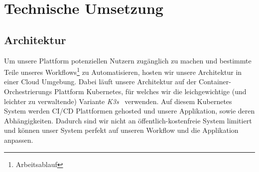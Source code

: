 
\chapter{Technische Umsetzung}


\section{Architektur}
Um unsere Plattform potenziellen Nutzern zugänglich zu machen und bestimmte Teile unseres Workflows\footnote{Arbeitsablauf} zu Automatisieren, hosten wir unsere Architektur in einer Cloud Umgebung.
Dabei läuft unsere Architektur auf der Container-Orchestrierungs Plattform Kubernetes, für welches wir die leichgewichtige (und leichter zu verwaltende) Variante \textit{K3s}~\parencite{web/K3s} verwenden.
Auf diesem Kubernetes System werden \ac{CI/CD} Plattformen gehosted und unsere Applikation, sowie deren Abhängigkeiten. Dadurch sind wir nicht an öffentlich-kostenfreie System limitiert und können unser
System perfekt auf unseren Workflow und die Applikation anpassen.

